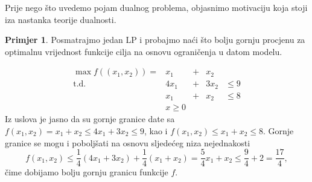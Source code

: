 \documentclass[a4paper, utf8, 11pt, colorlinks]{book}
\theoremstyle{definition}
\newtheorem{primjer}{Primjer}[chapter]
\begin{document}
 Prije nego što uvedemo pojam dualnog problema, objasnimo motivaciju koja stoji iza nastanka teorije dualnosti.
 
 \begin{primjer}
 	Posmatrajmo jedan LP i probajmo naći što bolju gornju procjenu za optimalnu vrijednost  funkcije cilja na osnovu ograničenja u datom modelu.
 	\end{primjer}
 
$$ 
\begin{array}{lllll}
    \max                f((x_1,x_2))=  &x_1 &+& x_2   &               \\
    \mbox{t.d.}  &4x_1 & +&3 x_2 & \leq 9        \\
                          &x_1 &+ &x_2   &  \leq 8       \\
                          &x \geq 0  &  &     &      
 \end{array}
$$
 Iz uslova je jasno da su gornje granice date sa $f(x_1,x_2) = x_1 + x_2 \leq 4 x_1 + 3 x_2 \leq 9$, kao i 
$f(x_1,x_2) \leq x_1 + x_2 \leq 8$. Gornje granice se mogu i poboljšati na osnovu sljedećeg niza nejednakosti
$$f(x_1,x_2) \leq \frac{1}{4}(  4 x_1 + 3 x_2  ) + \frac{1}{4}(    x_1 +   x_2 ) = \frac{5}{4}x_1 + x_2 \leq  \frac{9}{4} + 2 = \frac{17}{4},$$ 
čime dobijamo bolju gornju granicu funkcije $f$. 
\end{document}
